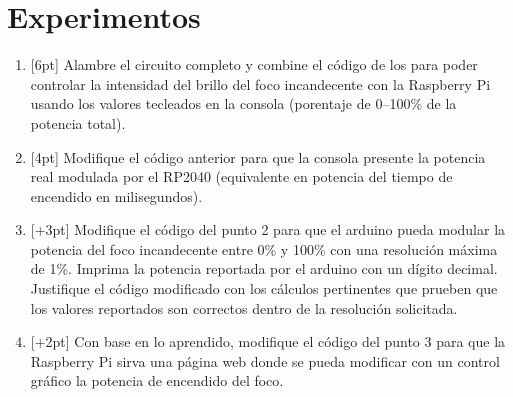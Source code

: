 %
%


\section{Experimentos}%
\label{sec:experiments}

\begin{enumerate}
	\item{} [6pt] Alambre el circuito completo y combine el código de los  para poder controlar la intensidad del brillo del foco incandecente con la Raspberry Pi usando los valores tecleados en la consola (porentaje de 0--100\% de la potencia total).

	\item{} [4pt] Modifique el código anterior para que la consola presente la potencia real modulada por el RP2040 (equivalente en potencia del tiempo de encendido en milisegundos).

	\item{} [+3pt] Modifique el código del punto 2 para que el arduino pueda modular la potencia del foco incandecente entre 0\% y 100\% con una resolución máxima de 1\%. Imprima la potencia reportada por el arduino con un dígito decimal.
	Justifique el código modificado con los cálculos pertinentes que prueben que los valores reportados son correctos dentro de la resolución solicitada.

	\item{} [+2pt] Con base en lo aprendido, modifique el código del punto 3 para que la Raspberry Pi sirva una página web donde se pueda modificar con un control gráfico la potencia de encendido del foco.
\end{enumerate}
